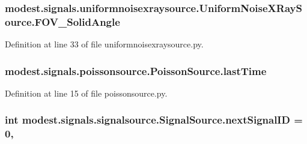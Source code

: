 \subsubsection[{\texorpdfstring{F\+O\+V\+\_\+\+Solid\+Angle}{FOV_SolidAngle}}]{\setlength{\rightskip}{0pt plus 5cm}modest.\+signals.\+uniformnoisexraysource.\+Uniform\+Noise\+X\+Ray\+Source.\+F\+O\+V\+\_\+\+Solid\+Angle}\hypertarget{classmodest_1_1signals_1_1uniformnoisexraysource_1_1UniformNoiseXRaySource_a8cea08a8576dbaaab7da58569eeac3c1}{}\label{classmodest_1_1signals_1_1uniformnoisexraysource_1_1UniformNoiseXRaySource_a8cea08a8576dbaaab7da58569eeac3c1}


Definition at line 33 of file uniformnoisexraysource.\+py.

\subsubsection[{\texorpdfstring{last\+Time}{lastTime}}]{\setlength{\rightskip}{0pt plus 5cm}modest.\+signals.\+poissonsource.\+Poisson\+Source.\+last\+Time\hspace{0.3cm}{\ttfamily [inherited]}}\hypertarget{classmodest_1_1signals_1_1poissonsource_1_1PoissonSource_a34395fc83bd8743a0a5ee69f9392a606}{}\label{classmodest_1_1signals_1_1poissonsource_1_1PoissonSource_a34395fc83bd8743a0a5ee69f9392a606}


Definition at line 15 of file poissonsource.\+py.

\subsubsection[{\texorpdfstring{next\+Signal\+ID}{nextSignalID}}]{\setlength{\rightskip}{0pt plus 5cm}int modest.\+signals.\+signalsource.\+Signal\+Source.\+next\+Signal\+ID = 0\hspace{0.3cm}{\ttfamily [static]}, {\ttfamily [inherited]}}\hypertarget{classmodest_1_1signals_1_1signalsource_1_1SignalSource_a453eafb550b551adbec0903deb63dfce}{}\label{classmodest_1_1signals_1_1signalsource_1_1SignalSource_a453eafb550b551adbec0903deb63dfce}


